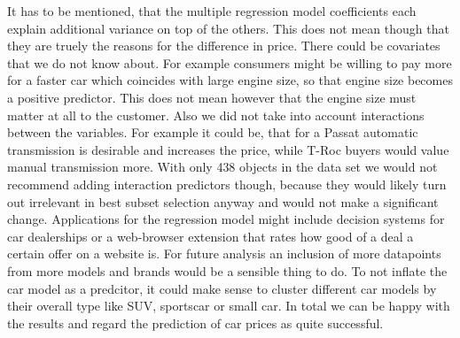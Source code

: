\documentclass[12 pt]{scrartcl}
\begin{document}
It has to be mentioned, that the multiple regression model coefficients each explain additional variance on top of the others. This does not mean though that they are truely the reasons for the difference in price. There could be covariates that we do not know about. For example consumers might be willing to pay more for a faster car which coincides with large engine size, so that engine size becomes a positive predictor. This does not mean however that the engine size must matter at all to the customer. Also we did not take into account interactions between the variables. For example it could be, that for a Passat automatic transmission is desirable and increases the price, while T-Roc buyers would value manual transmission more.
With only 438 objects in the data set we would not recommend adding interaction predictors though, because they would likely turn out irrelevant in best subset selection anyway and would not make a significant change.
Applications for the regression model might include decision systems for car dealerships or a web-browser extension that rates how good of a deal a certain offer on a website is. For future analysis an inclusion of more datapoints from more models and brands would be a sensible thing to do. To not inflate the car model as a predcitor, it could make sense to cluster different car models by their overall type like SUV, sportscar or small car.
In total we can be happy with the results and regard the prediction of car prices as quite successful.

\newpage
{}
\renewcommand\refname{Bibliography}


\end{document}
